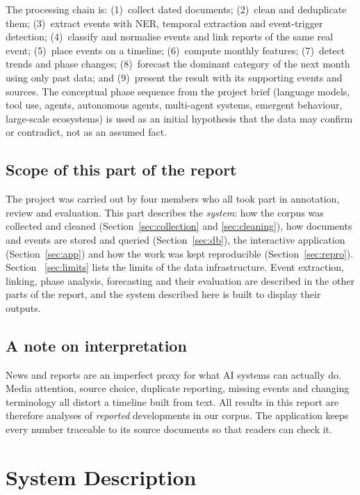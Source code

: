 \documentclass[11pt,a4paper]{article}
\begin{document}
The processing chain is: (1)~collect dated documents; (2)~clean and deduplicate them; (3)~extract events with
NER, temporal extraction and event-trigger detection; (4)~classify and normalise events and link reports of the
same real event; (5)~place events on a timeline; (6)~compute monthly features; (7)~detect trends and phase
changes; (8)~forecast the dominant category of the next month using only past data; and (9)~present the result
with its supporting events and sources. The conceptual phase sequence from the project brief (language models,
tool use, agents, autonomous agents, multi-agent systems, emergent behaviour, large-scale ecosystems) is used as
an initial hypothesis that the data may confirm or contradict, not as an assumed fact.

\subsection{Scope of this part of the report}
The project was carried out by four members who all took part in annotation, review and evaluation. This part
describes the \emph{system}: how the corpus was collected and cleaned (Section~\ref{sec:collection} and
\ref{sec:cleaning}), how documents and events are stored and queried (Section~\ref{sec:db}), the interactive
application (Section~\ref{sec:app}) and how the work was kept reproducible (Section~\ref{sec:repro}). Section~%
\ref{sec:limits} lists the limits of the data infrastructure. Event extraction, linking, phase analysis,
forecasting and their evaluation are described in the other parts of the report, and the system described here
is built to display their outputs.

\subsection{A note on interpretation}
News and reports are an imperfect proxy for what AI systems can actually do. Media attention, source choice,
duplicate reporting, missing events and changing terminology all distort a timeline built from text. All
results in this report are therefore analyses of \emph{reported} developments in our corpus. The application
keeps every number traceable to its source documents so that readers can check it.

\section{System Description}
\label{sec:system}
\end{document}

